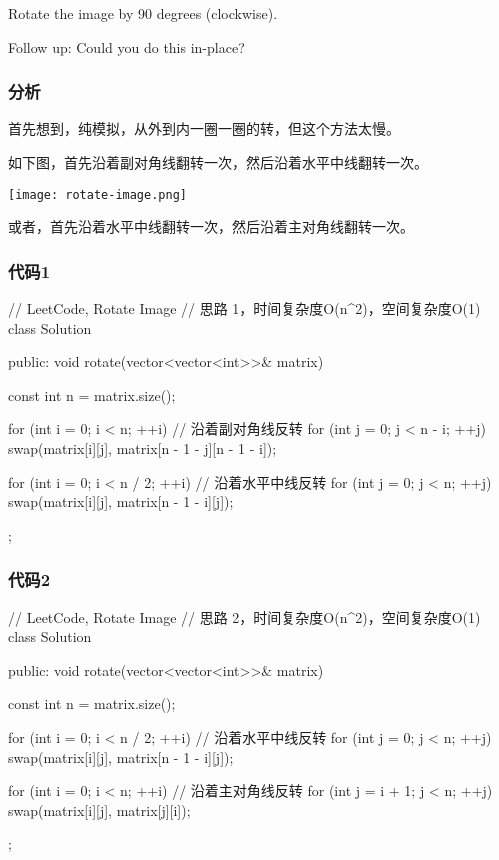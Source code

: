 Rotate the image by 90 degrees (clockwise).

Follow up:
Could you do this in-place?


\subsubsection{分析}
首先想到，纯模拟，从外到内一圈一圈的转，但这个方法太慢。

如下图，首先沿着副对角线翻转一次，然后沿着水平中线翻转一次。

\begin{center}
\texttt{[image: rotate-image.png]}\\
\label{fig:rotate-image}
\end{center}

或者，首先沿着水平中线翻转一次，然后沿着主对角线翻转一次。


\subsubsection{代码1}
\begin{Code}
// LeetCode, Rotate Image
// 思路 1，时间复杂度O(n^2)，空间复杂度O(1)
class Solution {
public:
    void rotate(vector<vector<int>>& matrix) {
        const int n = matrix.size();

        for (int i = 0; i < n; ++i)  // 沿着副对角线反转
            for (int j = 0; j < n - i; ++j)
                swap(matrix[i][j], matrix[n - 1 - j][n - 1 - i]);

        for (int i = 0; i < n / 2; ++i) // 沿着水平中线反转
            for (int j = 0; j < n; ++j)
                swap(matrix[i][j], matrix[n - 1 - i][j]);
    }
};
\end{Code}

\subsubsection{代码2}
\begin{Code}
// LeetCode, Rotate Image
// 思路 2，时间复杂度O(n^2)，空间复杂度O(1)
class Solution {
public:
    void rotate(vector<vector<int>>& matrix) {
        const int n = matrix.size();

        for (int i = 0; i < n / 2; ++i) // 沿着水平中线反转
            for (int j = 0; j < n; ++j)
                swap(matrix[i][j], matrix[n - 1 - i][j]);

        for (int i = 0; i < n; ++i)  // 沿着主对角线反转
            for (int j = i + 1; j < n; ++j)
                swap(matrix[i][j], matrix[j][i]);
    }
};
\end{Code}


